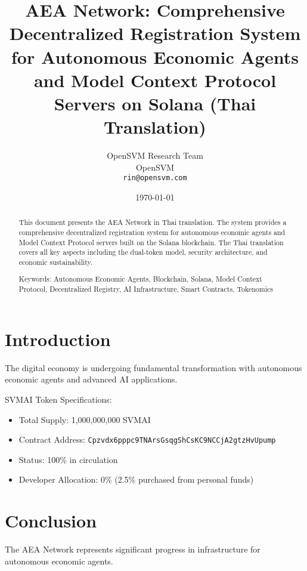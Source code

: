 \documentclass[12pt,a4paper]{article}
\title{AEA Network: Comprehensive Decentralized Registration System for Autonomous Economic Agents and Model Context Protocol Servers on Solana (Thai Translation)}
\author{OpenSVM Research Team \\ OpenSVM \\ \texttt{rin@opensvm.com}}
\date{\today}
\begin{document}
\maketitle

\begin{abstract}
This document presents the AEA Network in Thai translation. The system provides a comprehensive decentralized registration system for autonomous economic agents and Model Context Protocol servers built on the Solana blockchain. The Thai translation covers all key aspects including the dual-token model, security architecture, and economic sustainability.

Keywords: Autonomous Economic Agents, Blockchain, Solana, Model Context Protocol, Decentralized Registry, AI Infrastructure, Smart Contracts, Tokenomics
\end{abstract}

\section{Introduction}
The digital economy is undergoing fundamental transformation with autonomous economic agents and advanced AI applications.

SVMAI Token Specifications:
\begin{itemize}
\item Total Supply: 1,000,000,000 SVMAI
\item Contract Address: \texttt{Cpzvdx6pppc9TNArsGsqgShCsKC9NCCjA2gtzHvUpump}
\item Status: 100\% in circulation
\item Developer Allocation: 0\% (2.5\% purchased from personal funds)
\end{itemize}

\section{Conclusion}
The AEA Network represents significant progress in infrastructure for autonomous economic agents.
\end{document}
